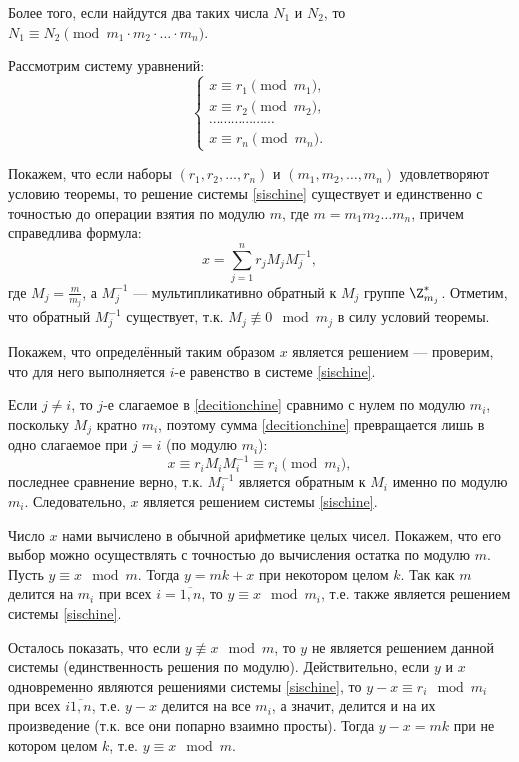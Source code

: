 \begin{enumerate}
\begin{thrm}
Более того, если найдутся два таких числа $N_1$ и $N_2$, то $N_{1}\equiv N_{2}\pmod  {m_{1}\cdot m_{2}\cdot \ldots \cdot m_{n}}$.
\end{thrm}
\pf
Рассмотрим систему уравнений:
\begin{equation}\label{sischine}
\begin{cases}
x\equiv r_{1}{\pmod {m_{1}}},\\
x\equiv r_{2}{\pmod {m_{2}}},\\
\cdots \cdots \cdots \cdots \cdots \cdots \\
x\equiv r_{n}{\pmod {m_{n}}}.
\end{cases}
\end{equation}

Покажем, что если наборы $(r_{1},r_{2},\dots ,r_{n})$ и $(m_{1},m_{2},\dots ,m_{n})$ удовлетворяют условию теоремы, то решение системы \eqref{sischine} существует и единственно с точностью до операции взятия по модулю $m$, где $m=m_1m_2\dots m_n$, причем справедлива формула:
\begin{equation}\label{decitionchine}
x=\sum _{{j=1}}^{n}r_{j}M_{j}M_{j}^{{-1}},
\end{equation}
где $M_{j}=\frac m{m_{j}}$, а $M_{j}^{{-1}}$ --- мультипликативно обратный к $M_{j}$ группе $\Z_{m_j}^*$. Отметим, что обратный $M_j^{-1}$ существует, т.к. $M_j\not\equiv 0\mod m_j$ в силу условий теоремы.

Покажем, что определённый таким образом $x$ является решением --- проверим, что для него выполняется $i$-е равенство в системе \eqref{sischine}.

Если $j\ne i$, то $j$-е слагаемое в \eqref{decitionchine} сравнимо с нулем по модулю $m_i$, поскольку $M_j$ кратно $m_i$, поэтому сумма \eqref{decitionchine} превращается лишь в одно слагаемое при $j=i$ (по модулю $m_i$):
$$
x\equiv r_{i}M_{i}M_{i}^{{-1}}\equiv r_i\pmod m_i,
$$
последнее сравнение верно, т.к. $M_i^{-1}$ является обратным к $M_i$ именно по модулю $m_i$. Следовательно,
$x$ является решением системы \eqref{sischine}.

Число $x$ нами вычислено в обычной арифметике целых чисел. Покажем, что его выбор можно осуществлять с точностью до вычисления остатка по модулю $m$. Пусть $y\equiv x\mod m$. Тогда $y=mk+x$ при некотором целом $k$. Так как $m$ делится на $m_i$ при всех $i=\overline{1,n}$, то $y\equiv x\mod m_i$, т.е. также является решением системы \eqref{sischine}.

Осталось показать, что если $y\not\equiv x\mod m$, то $y$ не является решением данной системы (единственность решения по модулю). Действительно, если $y$ и $x$ одновременно являются решениями системы \eqref{sischine}, то $y-x \equiv r_i\mod m_i$ при всех $i\overline{1,n}$, т.е. $y-x$ делится на все $m_i$, а значит, делится и на их произведение (т.к. все они попарно взаимно просты). Тогда $y-x=mk$ при не котором целом $k$, т.е. $y\equiv x\mod m$.


\end{enumerate}
